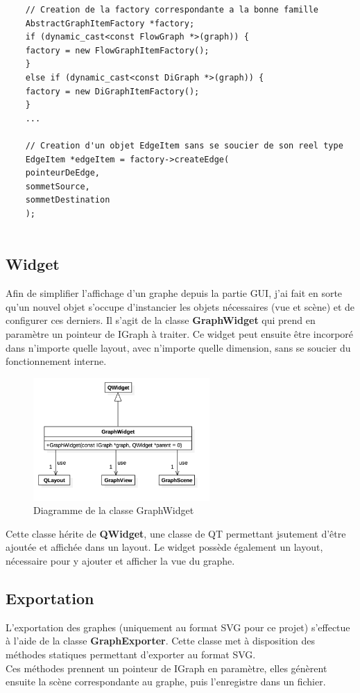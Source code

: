 \documentclass[french]{article}
\begin{document}
	\begin{lstlisting}
	// Creation de la factory correspondante a la bonne famille
	AbstractGraphItemFactory *factory;
	if (dynamic_cast<const FlowGraph *>(graph)) {
	factory = new FlowGraphItemFactory();
	}
	else if (dynamic_cast<const DiGraph *>(graph)) {
	factory = new DiGraphItemFactory();
	}
	...
	
	// Creation d'un objet EdgeItem sans se soucier de son reel type
	EdgeItem *edgeItem = factory->createEdge(
	pointeurDeEdge,
	sommetSource,
	sommetDestination
	);
	
	\end{lstlisting}
	
	\pagebreak
	
	\subsection{Widget}
	Afin de simplifier l'affichage d'un graphe depuis la partie GUI, j'ai fait en sorte qu'un nouvel objet s'occupe d'instancier les objets nécessaires (vue et scène) et de configurer ces derniers. Il s'agit de la classe \textbf{GraphWidget} qui prend en paramètre un pointeur de IGraph à traiter. Ce widget peut ensuite être incorporé dans n'importe quelle layout, avec n'importe quelle dimension, sans se soucier du fonctionnement interne.
	
	\begin{figure}[H]
		\centering
		\includegraphics[width=0.6\textwidth]{Conception/visualization/graphwidget.png}
		\caption{Diagramme de la classe GraphWidget}
	\end{figure}
	
	Cette classe hérite de \textbf{QWidget}, une classe de QT permettant jsutement d'être ajoutée et affichée dans un layout. Le widget possède également un layout, nécessaire pour y ajouter et afficher la vue du graphe.
	
	\subsection{Exportation}
	L'exportation des graphes (uniquement au format SVG pour ce projet) s'effectue à l'aide de la classe \textbf{GraphExporter}. Cette classe met à disposition des méthodes statiques permettant d'exporter au format SVG. \\
	Ces méthodes prennent un pointeur de IGraph en paramètre, elles génèrent ensuite la scène correspondante au graphe, puis l'enregistre dans un fichier.
	
\end{document}
